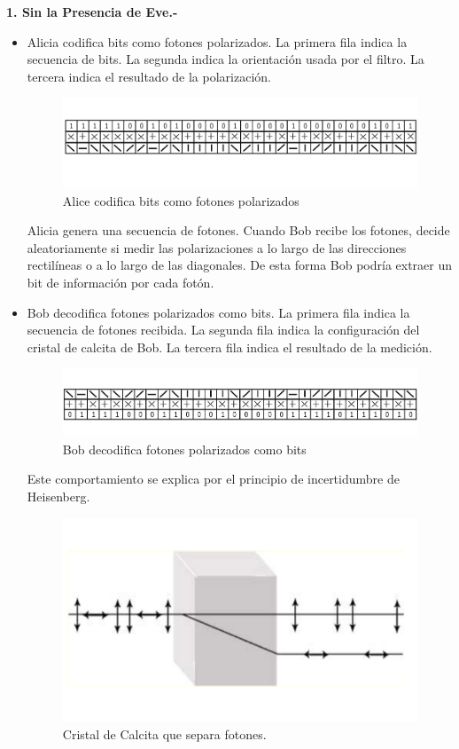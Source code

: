 \documentclass[11pt, conference]{IEEEtran}
\begin{document}
{\bf 1. Sin la Presencia de Eve.- }
\begin{itemize}
	\item Alicia codifica bits como fotones polarizados. La primera fila indica la secuencia de bits. La segunda indica la orientación usada por el filtro. La tercera indica el resultado de la polarización.\cite{Papa03}
	
	\begin{figure}[hbtp]
		\centering
		\includegraphics[scale=0.22]{2.png} 
		\caption{Alice codifica bits como fotones polarizados}
	\end{figure}
	
	Alicia genera una secuencia de fotones. Cuando Bob recibe los fotones, decide aleatoriamente si medir las polarizaciones a lo largo de las direcciones rectilíneas o a lo largo de las diagonales. De esta forma Bob podría extraer un bit de información por cada fotón.
	
	\item Bob decodifica fotones polarizados como bits. La primera fila indica la secuencia de fotones recibida. La segunda fila indica la configuración del cristal de calcita de Bob. La tercera fila indica el resultado de la medición.
	
	\begin{figure}[h]
		\centering
		\includegraphics[scale=0.22]{3.png} 
		\caption{Bob decodifica fotones polarizados como bits}
	\end{figure}
	
	Este comportamiento se explica por el principio de incertidumbre de Heisenberg.
	\begin{figure}[h]
		\centering
		\includegraphics[scale=0.15]{4.png} 
		\caption{Cristal de Calcita que separa fotones.}
	\end{figure}
	

\end{itemize}
\end{document}

